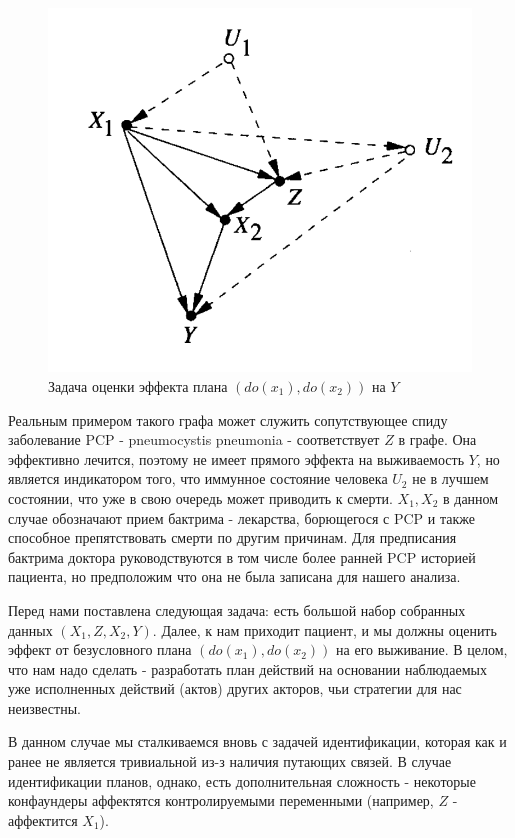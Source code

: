 \documentclass[fleqn]{article}
\numberwithin{equation}{section}
\numberwithin{theorem}{section}
\numberwithin{figure}{section}
\numberwithin{lemma}{section}
\begin{document}
\begin{figure}[h]
	\begin{center}
		\includegraphics[scale=0.6]{imgs/img26.png}
	\end{center}
	\caption{Задача оценки эффекта плана $(do(x_1), do(x_2))$ на $Y$}
	\label{fig:dynamic_plan}
\end{figure}


Реальным примером такого графа может служить сопутствующее спиду заболевание PCP - pneumocystis pneumonia - соответствует $Z$ в графе. Она эффективно лечится, поэтому не имеет прямого эффекта на выживаемость $Y$, но является индикатором того, что иммунное состояние человека $U_2$ не в лучшем состоянии, что уже в свою очередь может приводить к смерти. $X_1, X_2$ в данном случае обозначают прием бактрима - лекарства, борющегося с PCP и также способное препятствовать смерти по другим причинам. Для предписания бактрима доктора руководствуются в том числе более ранней PCP историей пациента, но предположим что она не была записана для нашего анализа. 

Перед нами поставлена следующая задача: есть большой набор собранных данных $(X_1, Z, X_2, Y)$. Далее, к нам приходит пациент, и мы должны оценить эффект от безусловного плана $(do(x_1), do(x_2))$ на его выживание. В целом, что нам надо сделать - разработать план действий на основании наблюдаемых уже исполненных действий (актов) других акторов, чьи стратегии для нас неизвестны. 

В данном случае мы сталкиваемся вновь с задачей идентификации, которая как и ранее не является тривиальной из-з наличия путающих связей. В случае идентификации планов, однако, есть дополнительная сложность - некоторые конфаундеры аффектятся контролируемыми переменными (например, $Z$ - аффектится $X_1$). 
\end{document}

